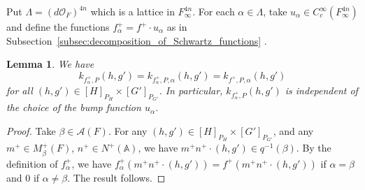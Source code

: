 \documentclass[letterpaper,11pt]{amsart}
\newcommand{\bA}{\mathbb{A}}
\newcommand{\cA}{\mathcal{A}}
\newcommand{\cO}{\mathcal{O}}
\newcommand{\<}{\negthickspace}
\theoremstyle{definition}
\theoremstyle{plain}
\newtheorem{lemma}[definition]{Lemma}
\theoremstyle{remark}
\numberwithin{equation}{section}
\begin{document}
Put $\Lambda = (d\cO_F)^{4n}$ which is a lattice in $F_\infty^{4n}$. For each
$\alpha \in \Lambda$, take $u_{\alpha} \in C_c^\infty(F^{4n}_\infty)$ and define
the functions $f^+_\alpha = f^+ \cdot u_{\alpha}$ as in
Subsection~\ref{subsec:decomposition_of_Schwartz_functions} .

\begin{lemma}   \label{lem:kernel_function_of_truncated_function_linear}
We have
    \[
    k_{f^+_{\alpha}, P}(h, g') =
    k_{f^+_{\alpha}, P, \alpha}(h, g') = k_{f^+, P, \alpha}(h, g')
    \]
for all $(h, g') \in [H]_{P_H} \times [G']_{P_{G'}}$. In particular, $k_{f^+_\alpha, P}(h, g')$ is independent of the choice of the bump function
$u_\alpha$.
\end{lemma}

\begin{proof}
Take $\beta \in \cA(F)$.
For any $(h, g') \in [H]_{P_H} \times [G']_{P_{G'}}$, and any $m^+ \in
M^+_\beta(F)$, $n^+ \in N^+(\bA)$, we have $m^+n^+ \cdot (h, g') \in
q^{-1}(\beta)$. By the definition of $f^+_{\alpha}$, we
have $f^+_{\alpha}(m^+ n^+ \cdot (h, g')) = f^+(m^+ n^+ \cdot (h, g'))$ if $\alpha = \beta$ and $0$ if
$\alpha \not=\beta$. The result follows.
\end{proof}
\end{document}
